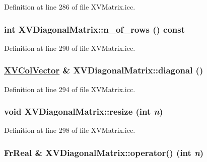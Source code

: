 Definition at line 286 of file XVMatrix.icc.\label{XVDiagonalMatrix_a3}
\hypertarget{class_XVDiagonalMatrix_a3}{
\subsubsection[n_of_rows]{\setlength{\rightskip}{0pt plus 5cm}int XVDiagonal\-Matrix::n\_\-of\_\-rows () const}}




Definition at line 290 of file XVMatrix.icc.\label{XVDiagonalMatrix_a4}
\hypertarget{class_XVDiagonalMatrix_a4}{
\subsubsection[diagonal]{\setlength{\rightskip}{0pt plus 5cm}\hyperlink{class_XVColVector}{XVCol\-Vector} \& XVDiagonal\-Matrix::diagonal ()}}




Definition at line 294 of file XVMatrix.icc.\label{XVDiagonalMatrix_a5}
\hypertarget{class_XVDiagonalMatrix_a5}{
\subsubsection[resize]{\setlength{\rightskip}{0pt plus 5cm}void XVDiagonal\-Matrix::resize (int {\em n})}}




Definition at line 298 of file XVMatrix.icc.\label{XVDiagonalMatrix_a6}
\hypertarget{class_XVDiagonalMatrix_a6}{
\subsubsection[operator()]{\setlength{\rightskip}{0pt plus 5cm}Fr\-Real \& XVDiagonal\-Matrix::operator() (int {\em n})}}




